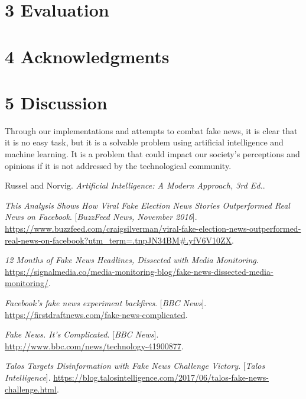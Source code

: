 \documentclass{neu_handout}
\begin{document}
\section*{3 Evaluation}

\section*{4 Acknowledgments}


\section*{5 Discussion}

Through our implementations and attempts to combat fake news, it is clear that it is no easy task, but it is a solvable problem using artificial intelligence and machine learning. It is a problem that could impact our society's perceptions and opinions if it is not addressed by the technological community.


\begin{thebibliography}{9}

Russel and Norvig. 
\textit{Artificial Intelligence: A Modern Approach, 3rd Ed.}. 

 
\textit{This Analysis Shows How Viral Fake Election News Stories Outperformed Real News on Facebook}.
[\textit{BuzzFeed News, November 2016}].
\url{https://www.buzzfeed.com/craigsilverman/viral-fake-election-news-outperformed-real-news-on-facebook?utm_term=.tnpJN34BM#.yfV6V10ZX}.
 

\textit{12 Months of Fake News Headlines, Dissected with Media Monitoring}. 
 \url{https://signalmedia.co/media-monitoring-blog/fake-news-dissected-media-monitoring/}.

\textit{Facebook's fake news experiment backfires}.
[\textit{BBC News}]. 
 \url{https://firstdraftnews.com/fake-news-complicated}.
 
 
\textit{Fake News. It's Complicated}.
[\textit{BBC News}]. 
 \url{http://www.bbc.com/news/technology-41900877}.
 
\textit{Talos Targets Disinformation with Fake News Challenge Victory}.
[\textit{Talos Intelligence}]. 
 \url{https://blog.talosintelligence.com/2017/06/talos-fake-news-challenge.html}.

\end{thebibliography}
\end{document}
